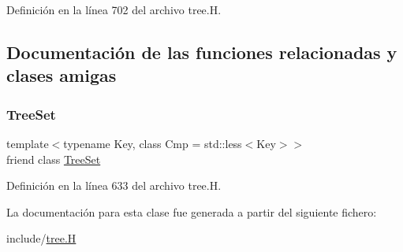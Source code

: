 Definición en la línea 702 del archivo tree.\+H.



\subsection{Documentación de las funciones relacionadas y clases amigas}
\mbox{\label{class_designar_1_1_tree_set_1_1_inorder_iterator_a7caa42294700d2a60905ec3458a7cd8a}} 
\subsubsection{\texorpdfstring{Tree\+Set}{TreeSet}}
{\footnotesize\ttfamily template$<$typename Key, class Cmp = std\+::less$<$\+Key$>$$>$ \\
friend class \hyperlink{class_designar_1_1_tree_set}{Tree\+Set}\hspace{0.3cm}{\ttfamily [friend]}}



Definición en la línea 633 del archivo tree.\+H.



La documentación para esta clase fue generada a partir del siguiente fichero\+:\begin{DoxyCompactItemize}
\item 
include/\hyperlink{tree_8_h}{tree.\+H}\end{DoxyCompactItemize}
